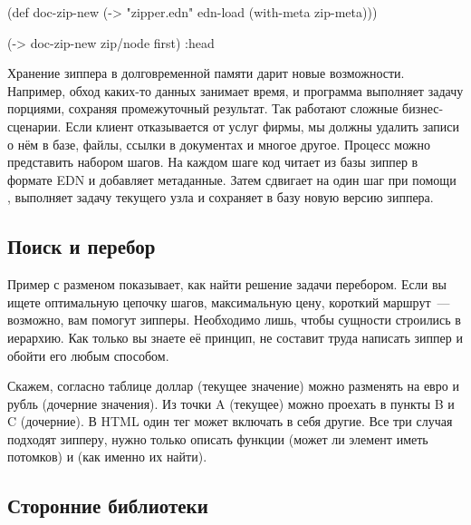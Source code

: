 \begin{english}
  \begin{clojure/lines}
(def doc-zip-new
  (-> "zipper.edn"
      edn-load
      (with-meta zip-meta)))

(-> doc-zip-new zip/node first)
:head
  \end{clojure/lines}
\end{english}

Хранение зиппера в долговременной памяти дарит новые воз\-мож\-нос\-ти. Например,
обход каких-то данных занимает время, и программа выполняет задачу порциями,
сохраняя промежуточный результат. Так работают сложные бизнес-сценарии. Если
клиент отказывается от услуг фирмы, мы должны удалить записи о нём в базе, файлы,
ссылки в документах и многое другое. Процесс можно представить набором
шагов. На каждом шаге код читает из базы зиппер в формате EDN и добавляет
метаданные. Затем сдвигает на один шаг при помощи , выполняет
задачу текущего узла и сохраняет в базу новую версию зиппера.

\subsection{Поиск и перебор}


Пример с разменом показывает, как найти решение задачи перебором. Если вы ищете
оптимальную цепочку шагов, максимальную цену, короткий маршрут~--- возможно, вам
помогут зипперы. Необходимо лишь, чтобы сущности строились в иерархию. Как
только вы знаете её принцип, не составит труда написать зиппер и обойти его
любым способом.

Скажем, согласно таблице доллар (текущее значение) можно разменять на евро и
рубль (дочерние значения). Из точки A (текущее) можно проехать в пункты B и C
(дочерние). В HTML один тег может включать в себя другие. Все три случая
подходят зипперу, нужно только описать функции  (может ли элемент
иметь потомков) и  (как именно их найти).

\subsection{Сторонние библиотеки}

\def\zippo{https://github.com/igrishaev/zippo}
\def\datazip{https://github.com/clojure/data.zip}


